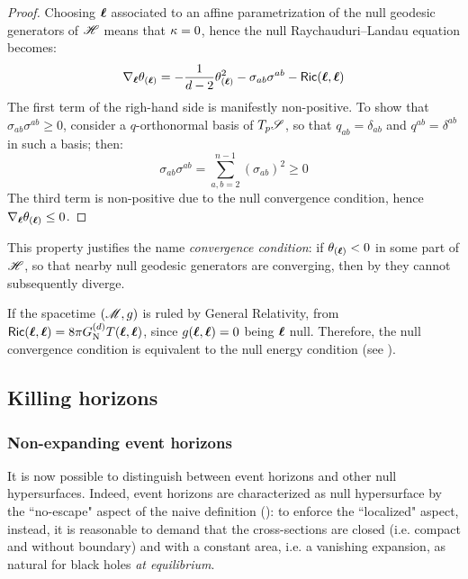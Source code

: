 \begin{proofbox}
  \begin{proof}
    Choosing $ \boldsymbol{\ell} $ associated to an affine parametrization of the null geodesic generators of $ \mathscr{H} $ means that $ \kappa = 0 $, hence the null Raychauduri--Landau equation becomes:
    \begin{equation*}
      \nabla_{\boldsymbol{\ell}} \theta_{(\boldsymbol{\ell})} = - \frac{1}{d - 2} \theta_{(\boldsymbol{\ell})}^2 - \sigma_{ab} \sigma^{ab} - \textsf{Ric}(\boldsymbol{\ell} , \boldsymbol{\ell})
    \end{equation*}
    The first term of the righ-hand side is manifestly non-positive. To show that $ \sigma_{ab} \sigma^{ab} \geq 0 $, consider a $ q $-orthonormal basis of $ T_p \mathscr{S} $, so that $ q_{ab} = \delta_{ab} $ and $ q^{ab} = \delta^{ab} $ in such a basis; then:
    \begin{equation*}
      \sigma_{ab} \sigma^{ab} = \sum_{a,b = 2}^{n-1} (\sigma_{ab})^2 \geq 0
      \label{eq:convergence}
    \end{equation*}
    The third term is non-positive due to the null convergence condition, hence $ \nabla_{\boldsymbol{\ell}} \theta_{(\boldsymbol{\ell})} \leq 0 $.
  \end{proof}
\end{proofbox}

This property justifies the name \emph{convergence condition}: if $ \theta_{(\boldsymbol{\ell})} < 0 $ in some part of $ \mathscr{H} $, so that nearby null geodesic generators are converging, then by  they cannot subsequently diverge.

If the spacetime $ (\mathscr{M} , g) $ is ruled by General Relativity, from  $ \textsf{Ric}(\boldsymbol{\ell} , \boldsymbol{\ell}) = 8\pi G_\text{N}^{(d)} T(\boldsymbol{\ell} , \boldsymbol{\ell}) $, since $ g(\boldsymbol{\ell} , \boldsymbol{\ell}) = 0 $ being $ \boldsymbol{\ell} $ null. Therefore, the null convergence condition is equivalent to the null energy condition (see ).

\subsection{Killing horizons}

\subsubsection{Non-expanding event horizons}

It is now possible to distinguish between event horizons and other null hypersurfaces. Indeed, event horizons are characterized as null hypersurface by the ``no-escape" aspect of the naive definition (): to enforce the ``localized" aspect, instead, it is reasonable to demand that the cross-sections are closed (i.e. compact and without boundary) and with a constant area, i.e. a vanishing expansion, as natural for black holes \emph{at equilibrium}.


